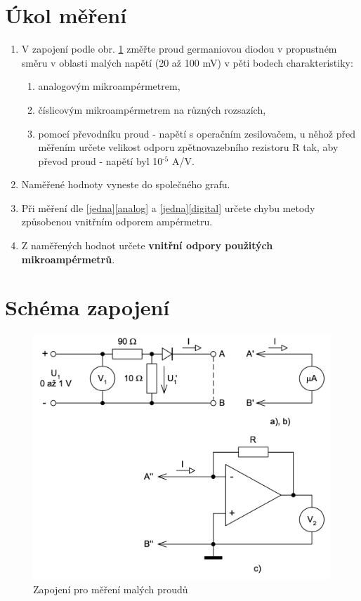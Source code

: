 \documentclass[a4paper,12pt]{article}   %
\newcommand{\texp}[1]{$^\textrm{#1}$}
\begin{document}
\section{Úkol měření}
\label{zadani}
\begin{enumerate}
    \item V zapojení podle obr. \ref{fig:schema} změřte proud germaniovou diodou v propustném směru v oblasti malých napětí (20 až 100 mV) v pěti bodech charakteristiky:\label{jedna}
    \begin{enumerate}[label=\alph*)]
        \item analogovým mikroampérmetrem,\label{analog}
        \item číslicovým mikroampérmetrem na různých rozsazích,\label{digital}
        \item pomocí převodníku proud - napětí s operačním zesilovačem, u něhož před měřením určete velikost odporu zpětnovazebního rezistoru R tak, aby převod proud - napětí byl 10\texp{-5} A/V.
    \end{enumerate}
    \item Naměřené hodnoty vyneste do společného grafu.
    \item Při měření dle \ref{jedna}\ref{analog} a \ref{jedna}\ref{digital} určete chybu metody způsobenou vnitřním odporem ampérmetru.
    \item Z naměřených hodnot určete \textbf{vnitřní odpory použitých mikroampérmetrů}.
\end{enumerate}

\section{Schéma zapojení}
\label{schema_zapojeni}
\begin{figure}[h!]
    \centering
    \includegraphics[width=.8\textwidth]{schema.png}
    \caption{Zapojení pro měření malých proudů \cite{navod}}
    \label{fig:schema}
\end{figure}
\end{document}

